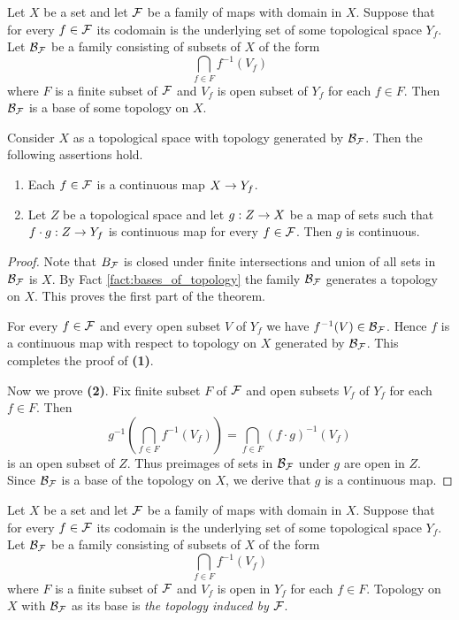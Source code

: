 \begin{theorem}\label{theorem:topology_induced_on_domain_of_a_family_of_maps}
	Let $X$ be a set and let ${\mathcal F}$ be a family of maps with domain in $X$. Suppose that for every $f \in {\mathcal F}$ its codomain is the underlying set of some topological space $Y_f$. Let ${\mathcal B}_{{\mathcal F}}$ be a family consisting of subsets of $X$ of the form
	$$\bigcap_{f\in F}f^{-1}(V_f)$$
	where $F$ is a finite subset of ${\mathcal F}$ and $V_f$ is open subset of $Y_f$ for each $f\in F$. Then ${\mathcal B}_{{\mathcal F}}$ is a base of some topology on $X$.

	Consider $X$ as a topological space with topology generated by ${\mathcal B}_{{\mathcal F}}$. Then the following assertions hold.
	\begin{enumerate}[label=\emph{\textbf{(\arabic*)}}, leftmargin=3.0em]
		\item Each $f \in {\mathcal F}$ is a continuous map $X \rightarrow Y_f$.
		\item Let $Z$ be a topological space and let $g:Z\rightarrow X$ be a map of sets such that $f\cdot g:Z\rightarrow Y_f$ is continuous map for every $f \in {\mathcal F}$. Then $g$ is continuous.
	\end{enumerate}
\end{theorem}
\begin{proof}
	Note that $B_{{\mathcal F}}$ is closed under finite intersections and union of all sets in ${\mathcal B}_{{\mathcal F}}$ is $X$. By Fact \ref{fact:bases_of_topology} the family ${\mathcal B}_{{\mathcal F}}$ generates a topology on $X$. This proves the first part of the theorem.

	For every $f \in {\mathcal F}$ and every open subset $V$ of $Y_f$ we have $f^{-1}(V) \in {\mathcal B}_{{\mathcal F}}$. Hence $f$ is a continuous map with respect to topology on $X$ generated by ${\mathcal B}_{{\mathcal F}}$. This completes the proof of \textbf{(1)}.

	Now we prove \textbf{(2)}. Fix finite subset $F$ of ${\mathcal F}$ and open subsets $V_f$ of $Y_f$ for each $f\in F$. Then
	$$g^{-1}\left(\bigcap_{f\in F}f^{-1}(V_f)\right) = \bigcap_{f \in F}\left(f\cdot g\right)^{-1}(V_f)$$
	is an open subset of $Z$. Thus preimages of sets in ${\mathcal B}_{{\mathcal F}}$ under $g$ are open in $Z$. Since ${\mathcal B}_{{\mathcal F}}$ is a base of the topology on $X$, we derive that $g$ is a continuous map.
\end{proof}

\begin{definition}
	Let $X$ be a set and let ${\mathcal F}$ be a family of maps with domain in $X$. Suppose that for every $f \in {\mathcal F}$ its codomain is the underlying set of some topological space $Y_f$. Let ${\mathcal B}_{{\mathcal F}}$ be a family consisting of subsets of $X$ of the form
	$$\bigcap_{f\in F}f^{-1}(V_f)$$
	where $F$ is a finite subset of ${\mathcal F}$ and $V_f$ is open in $Y_f$ for each $f\in F$. Topology on $X$ with ${\mathcal B}_{{\mathcal F}}$ as its base is \textit{the topology induced by ${\mathcal F}$}.
\end{definition}

